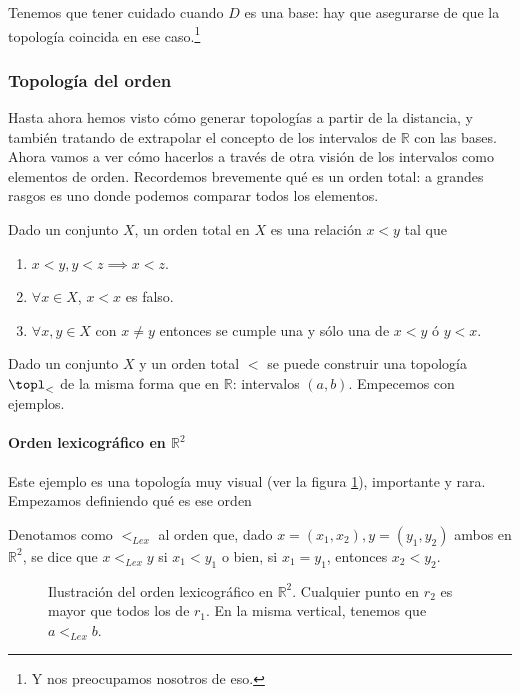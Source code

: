 \documentclass{apuntes}
\begin{document}
Tenemos que tener cuidado cuando $D$ es una base: hay que asegurarse de que la topología coincida en ese caso.\footnote{Y nos preocupamos nosotros de eso.}

\subsubsection{Topología del orden}

Hasta ahora hemos visto cómo generar topologías a partir de la distancia, y también tratando de extrapolar el concepto de los intervalos de $ℝ$ con las bases. Ahora vamos a ver cómo hacerlos a través de otra visión de los intervalos como elementos de orden. Recordemos brevemente qué es un orden total: a grandes rasgos es uno donde podemos comparar todos los elementos.

\begin{defn} Dado un conjunto $X$, un orden total en $X$ es una relación $x < y$ tal que

\begin{enumerate}
\item $x<y, y < z\implies x < z$.
\item $∀x∈X$, $x < x$ es falso.
\item $∀x,y∈X$ con $x≠y$ entonces se cumple una y sólo una de $x< y$ ó $y<x$.
\end{enumerate}
\end{defn}

Dado un conjunto $X$ y un orden total $<$ se puede construir una topología $\topl_<$ de la misma forma que en $ℝ$: intervalos $(a,b)$. Empecemos con ejemplos.

\paragraph{Orden lexicográfico en $ℝ^2$} Este ejemplo es una topología muy visual (ver la figura \ref{figOrdenLex}), importante y rara. Empezamos definiendo qué es ese orden

\begin{defn} Denotamos como $<_{Lex}$ al orden que, dado $x=(x_1,x_2), y=(y_1, y_2)$ ambos en $ℝ^2$, se dice que $x<_{Lex} y$ si $x_1 < y_1$ o bien, si $x_1 = y_1$, entonces $x_2 < y_2$.
\end{defn}

\begin{figure}
\caption{Ilustración del orden lexicográfico en $ℝ^2$. Cualquier punto en $r_2$ es mayor que todos los de $r_1$. En la misma vertical, tenemos que $a<_{Lex}b$.}
\label{figOrdenLex}
\end{figure}
\end{document}
